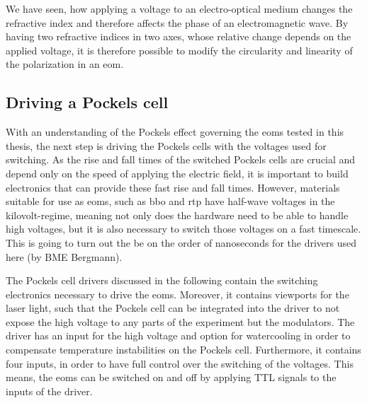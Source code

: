 We have seen, how applying a voltage to an electro-optical medium changes the refractive index and therefore affects the phase of an electromagnetic wave. By having two refractive indices in two axes, whose relative change depends on the applied voltage, it is therefore possible to modify the circularity and linearity of the polarization in an \acl{eom}.

\subsection{Driving a Pockels cell}
\label{sec:pockels_cell_drive}

With an understanding of the Pockels effect governing the \acp{eom} tested in this thesis, the next step is driving the Pockels cells with the voltages used for switching. As the rise and fall times of the switched Pockels cells are crucial and depend only on the speed of applying the electric field, it is important to build electronics that can provide these fast rise and fall times. However, materials suitable for use as \acp{eom}, such as \ac{bbo} and \ac{rtp} have half-wave voltages in the kilovolt-regime, meaning not only does the hardware need to be able to handle high voltages, but it is also necessary to switch those voltages on a fast timescale. This is going to turn out the be on the order of nanoseconds for the drivers used here (by BME Bergmann).


The Pockels cell drivers discussed in the following contain the switching electronics necessary to drive the \acp{eom}. Moreover, it contains viewports for the laser light, such that the Pockels cell can be integrated into the driver to not expose the high voltage to any parts of the experiment but the modulators. The driver has an input for the high voltage and option for watercooling in order to compensate temperature instabilities on the Pockels cell. Furthermore, it contains four inputs, in order to have full control over the switching of the voltages. This means, the \acp{eom} can be switched on and off by applying TTL signals to the inputs of the driver.


